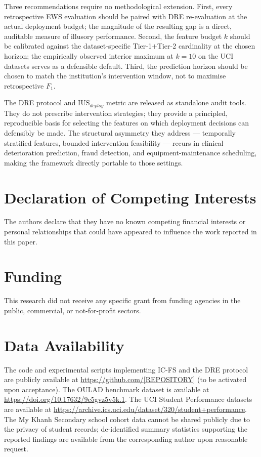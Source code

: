 \documentclass[a4paper,fleqn]{cas-sc}
\begin{document}
Three recommendations require no methodological extension. First, every retrospective EWS evaluation should be paired with DRE re-evaluation at the actual deployment budget; the magnitude of the resulting gap is a direct, auditable measure of illusory performance. Second, the feature budget $k$ should be calibrated against the dataset-specific Tier-1$+$Tier-2 cardinality at the chosen horizon; the empirically observed interior maximum at $k=10$ on the UCI datasets serves as a defensible default. Third, the prediction horizon should be chosen to match the institution's intervention window, not to maximise retrospective $F_1$.

The DRE protocol and $\mathrm{IUS}_{deploy}$ metric are released as standalone audit tools. They do not prescribe intervention strategies; they provide a principled, reproducible basis for selecting the features on which deployment decisions can defensibly be made. The structural asymmetry they address --- temporally stratified features, bounded intervention feasibility --- recurs in clinical deterioration prediction, fraud detection, and equipment-maintenance scheduling, making the framework directly portable to those settings.
 
\section*{Declaration of Competing Interests}
The authors declare that they have no known competing financial interests or personal relationships that could have appeared to influence the work reported in this paper.

\section*{Funding}
This research did not receive any specific grant from funding agencies in the public, commercial, or not-for-profit sectors.

\section*{Data Availability}
The code and experimental scripts implementing IC-FS and the DRE protocol are publicly available at \url{https://github.com/[REPOSITORY]} (to be activated upon acceptance). The OULAD benchmark dataset is available at \url{https://doi.org/10.17632/9c5gvz5v5k.1}. The UCI Student Performance datasets are available at \url{https://archive.ics.uci.edu/dataset/320/student+performance}. The My Khanh Secondary school cohort data cannot be shared publicly due to the privacy of student records; de-identified summary statistics supporting the reported findings are available from the corresponding author upon reasonable request.


\printcredits


\end{document}
